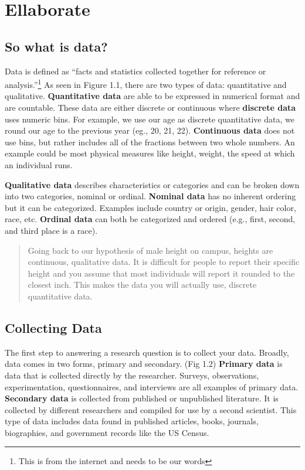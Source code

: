 \documentclass[
]{book}
\begin{document}
\hypertarget{ellaborate}{%
\section{Ellaborate}\label{ellaborate}}

\hypertarget{so-what-is-data}{%
\subsection{So what is data?}\label{so-what-is-data}}

Data is defined as ``facts and statistics collected together for
reference or analysis.''\footnote{This is from the internet and needs to
  be our words} As seen in Figure 1.1, there are two types of data:
quantitative and qualitative. \textbf{Quantitative data} are able to
be expressed in numerical format and are countable. These data
are either discrete or continuous where \textbf{discrete data} uses
numeric bins. For example, we use our age as discrete
quantitative data, we round our age to the previous year (eg.,
20, 21, 22). \textbf{Continuous data} does not use bins, but rather
includes all of the fractions between two whole numbers. An
example could be most physical measures like height, weight, the
speed at which an individual runs.

\textbf{Qualitative data} describes characteristics or categories and
can be broken down into two categories, nominal or ordinal.
\textbf{Nominal data} has no inherent ordering but it can be
categorized. Examples include country or origin, gender, hair
color, race, etc. \textbf{Ordinal data} can both be categorized and
ordered (e.g., first, second, and third place is a race).

\begin{quote}
Going back to our hypothesis of male height on campus, heights
are continuous, qualitative data. It is difficult for people to
report their specific height and you assume that most
individuals will report it rounded to the closest inch. This
makes the data you will actually use, discrete quantitative
data.
\end{quote}

\hypertarget{collecting-data}{%
\subsection{Collecting Data}\label{collecting-data}}

The first step to answering a research question is to collect
your data. Broadly, data comes in two forms, primary and
secondary. (Fig 1.2) \textbf{Primary data} is data that is collected
directly by the researcher. Surveys, observations,
experimentation, questionnaires, and interviews are all examples
of primary data. \textbf{Secondary data} is collected from published
or unpublished literature. It is collected by different
researchers and compiled for use by a second scientist. This type
of data includes data found in published articles, books,
journals, biographies, and government records like the US Census.
\end{document}
